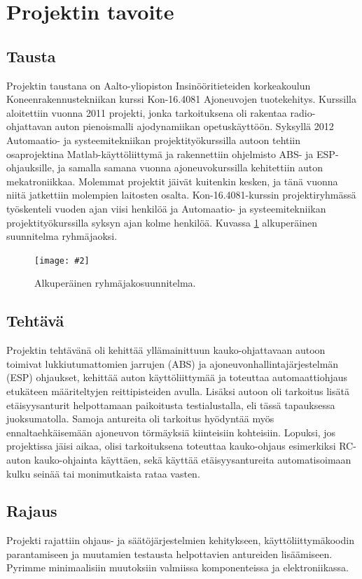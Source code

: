 \documentclass{article}
\newcommand{\kuvaa}[4]{%
	\begin{figure}[h]%
		\centering \texttt{[image: \#2]}%
		\caption{#3 \label{fig:#4}}%
	\end{figure}%
}
\begin{document}
\thispagestyle{empty}
\clearpage

\tableofcontents
\clearpage

\section{Projektin tavoite}

\subsection{Tausta}
Projektin taustana on Aalto-yliopiston Insinööritieteiden korkeakoulun Koneenrakennustekniikan kurssi Kon-16.4081 Ajoneuvojen tuotekehitys. Kurssilla aloitettiin vuonna 2011 projekti, jonka tarkoituksena oli rakentaa radio-ohjattavan auton pienoismalli ajodynamiikan opetuskäyttöön. Syksyllä 2012 Automaatio- ja systeemitekniikan projektityökurssilla autoon tehtiin osaprojektina Matlab-käyttöliittymä ja rakennettiin ohjelmisto ABS- ja ESP-ohjauksille, ja samalla samana vuonna ajoneuvokurssilla kehitettiin auton mekatroniikkaa. Molemmat projektit jäivät kuitenkin kesken, ja tänä vuonna niitä jatkettiin molempien laitosten osalta. Kon-16.4081-kurssin projektiryhmässä työskenteli vuoden ajan viisi henkilöä ja Automaatio- ja systeemitekniikan projektityökurssilla syksyn ajan kolme henkilöä. Kuvassa \ref{fig:ryhmajako} alkuperäinen suunnitelma ryhmäjaoksi.

\kuvaa{0.8}{ryhmajako}{Alkuperäinen ryhmäjakosuunnitelma.}{ryhmajako}

\subsection{Tehtävä}
Projektin tehtävänä oli kehittää yllämainittuun kauko-ohjattavaan autoon toimivat lukkiutumattomien jarrujen (ABS) ja ajoneuvonhallintajärjestelmän (ESP) ohjaukset, kehittää auton käyttöliittymää ja toteuttaa automaattiohjaus etukäteen määriteltyjen reittipisteiden avulla. Lisäksi autoon oli tarkoitus lisätä etäisyysanturit helpottamaan paikoitusta testialustalla, eli tässä tapauksessa juoksumatolla. Samoja antureita oli tarkoitus hyödyntää myös ennaltaehkäisemään ajoneuvon törmäyksiä kiinteisiin kohteisiin. Lopuksi, jos projektissa jäisi aikaa, olisi tarkoituksena toteuttaa kauko-ohjaus esimerkiksi RC-auton kauko-ohjainta käyttäen, sekä käyttää etäisyysantureita automatisoimaan kulku seinää tai monimutkaista rataa vasten.

\subsection{Rajaus}
Projekti rajattiin ohjaus- ja säätöjärjestelmien kehitykseen, käyttöliittymäkoodin parantamiseen ja muutamien testausta helpottavien antureiden lisäämiseen. Pyrimme minimaalisiin muutoksiin valmiissa komponenteissa ja elektroniikassa.
\end{document}
